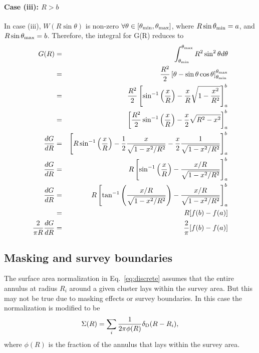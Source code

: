 \documentclass[a4paper,fleqn,usenatbib]{mnras}
\begin{document}
\paragraph{Case (iii): $R>b$}
In case (iii), $W(R\sin\theta)$ is non-zero $\forall \theta\in[\theta_{\rm min}, \theta_{\rm max}]$, where $R\sin\theta_{\rm min}=a$, and $R\sin\theta_{\rm max}=b$. Therefore, the integral for G(R) reduces to
\begin{eqnarray}
G(R) &=& \int_{\theta_{\rm min}}^{\theta_{\rm max}} R^2 \sin^2\theta  d\theta \\
&=& \frac{R^2}{2} \left[\theta-\sin\theta\cos\theta\right]_{\theta_{\rm min}}^{\theta_{\rm max}}\\
&=& \frac{R^2}{2} \left[\sin^{-1}\left(\frac{x}{R}\right) - \frac{x}{R}\sqrt{1-\frac{x^2}{R^2}} \right]_{a}^{b} \\
&=& \left[\frac{R^2}{2} \sin^{-1}\left(\frac{x}{R}\right) - \frac{x}{2}\sqrt{R^2-x^2} \right]_{a}^{b} \\
\frac{dG}{dR} &=& \left[R  \sin^{-1}\left(\frac{x}{R}\right) - \frac{1}{2} \frac{x}{\sqrt{1-x^2/R^2}} - \frac{x}{2}\frac{1}{\sqrt{1-x^2/R^2}}\right]_a^b\\
\frac{dG}{dR} &=& R  \left[\sin^{-1}\left(\frac{x}{R}\right) - \frac{x/R}{\sqrt{1-x^2/R^2}}\right]_a^b\\
\frac{dG}{dR} &=& R  \left[\tan^{-1}\left(\frac{x/R}{\sqrt{1-x^2/R^2}}\right) - \frac{x/R}{\sqrt{1-x^2/R^2}}\right]_a^b \\
&=& R [f(b) - f(a)] \\
\frac{2}{\pi R}\frac{dG}{dR} &=& \frac{2}{\pi} [ f(b) - f(a)]
\end{eqnarray}

\subsection{Masking and survey boundaries}
The surface area normalization in Eq.~\ref{eq:discrete} assumes that the entire annulus at radius $R_i$ around a given cluster lays within the survey area. But this may not be true due to masking effects or survey boundaries. In this case the normalization is modified to be
\begin{equation}
\Sigma(R) = \sum_i \frac{1}{2\pi\phi(R)} \delta_{\rm D}(R-R_i),
\end{equation}
where $\phi(R)$ is the fraction of the annulus that lays within the survey area.


\bsp
\label{lastpage}
\end{document}
